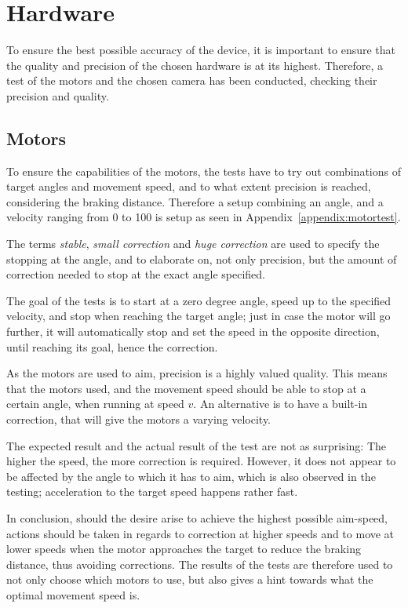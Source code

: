 \section{Hardware}\label{des:sec:hwtest}
To ensure the best possible accuracy of the device, it is important to ensure that the quality and precision of the chosen hardware is at its highest.
Therefore, a test of the motors and the chosen camera has been conducted, checking their precision and quality.

\subsection*{Motors}
To ensure the capabilities of the motors, the tests have to try out combinations of target angles and movement speed, and to what extent precision is reached, considering the braking distance.
Therefore a setup combining an angle, and a velocity ranging from 0 to 100 is setup as seen in Appendix~\ref{appendix:motortest}.

The terms \textit{stable}, \textit{small correction} and \textit{huge correction} are used to specify the stopping at the angle, and to elaborate on, not only precision, but the amount of correction needed to stop at the exact angle specified.

The goal of the tests is to start at a zero degree angle, speed up to the specified velocity, and stop when reaching the target angle; just in case the motor will go further, it will automatically stop and set the speed in the opposite direction, until reaching its goal, hence the correction.

As the motors are used to aim, precision is a highly valued quality.
This means that the motors used, and the movement speed should be able to stop at a certain angle, when running at speed $v$.
An alternative is to have a built-in correction, that will give the motors a varying velocity.

The expected result and the actual result of the test are not as surprising: The higher the speed, the more correction is required.
However, it does not appear to be affected by the angle to which it has to aim, which is also observed in the testing; acceleration to the target speed happens rather fast.

In conclusion, should the desire arise to achieve the highest possible aim-speed, actions should be taken in regards to 
 correction at higher speeds and to move at lower speeds when the motor approaches the target to reduce the braking distance, thus avoiding corrections.
The results of the tests are therefore used to not only choose which motors to use, but also gives a hint towards what the optimal movement speed is.

